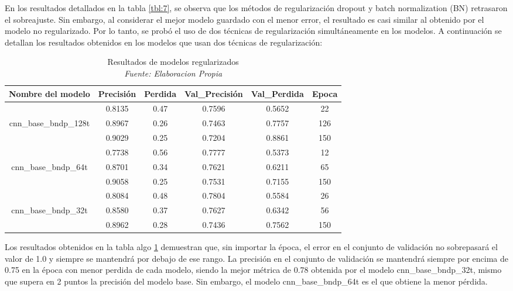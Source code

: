 En los resultados detallados en la tabla \ref{tbl:7}, se observa que los métodos de regularización dropout y batch normalization (BN) retrasaron el sobreajuste. Sin embargo, al considerar el mejor modelo guardado con el menor error, el resultado es casi similar al obtenido por el modelo no regularizado. Por lo tanto, se probó el uso de dos técnicas de regularización simultáneamente en los modelos. A continuación se detallan los resultados obtenidos en los modelos que usan dos técnicas de regularización:

\begin{table}[!ht]
	\centering
	\begin{tabular}{|c|c|c|c|c|c|}
		\hline
		\textbf{Nombre del modelo} & \textbf{Precisión} & \textbf{Perdida} & \textbf{Val\_Precisión} & \textbf{Val\_Perdida} & \textbf{Epoca} \\ \hline
		~ & 0.8135 & 0.47 & 0.7596 & 0.5652 & 22 \\ \cline{2-6}
		cnn\_base\_bndp\_128t & 0.8967 & 0.26 & 0.7463 & 0.7757 & 126 \\ \cline{2-6}
		~ & 0.9029 & 0.25 & 0.7204 & 0.8861 & 150 \\ \hline
		~ & 0.7738 & 0.56 & 0.7777 & 0.5373 & 12 \\ \cline{2-6}
		cnn\_base\_bndp\_64t & 0.8701 & 0.34 & 0.7621 & 0.6211 & 65 \\ \cline{2-6}
		~ & 0.9058 & 0.25 & 0.7531 & 0.7155 & 150 \\ \hline
		~ & 0.8084 & 0.48 & 0.7804 & 0.5584 & 26 \\ \cline{2-6}
		cnn\_base\_bndp\_32t & 0.8580 & 0.37 & 0.7627 & 0.6342 & 56 \\ \cline{2-6}
		~ & 0.8962 & 0.28 & 0.7436 & 0.7562 & 150 \\ \hline
	\end{tabular}
	\caption[Resultados de modelos regularizados]{Resultados de modelos regularizados
		\\\textit{Fuente: Elaboracion Propia}}
	\label{tbl:8}
\end{table}

Los resultados obtenidos en la tabla algo \ref{tbl:8} demuestran que, sin importar la época, el error en el conjunto de validación no sobrepasará el valor de 1.0 y siempre se mantendrá por debajo de ese rango. La precisión en el conjunto de validación se mantendrá siempre por encima de 0.75 en la época con menor perdida de cada modelo, siendo la mejor métrica de 0.78 obtenida por el modelo cnn\_base\_bndp\_32t, mismo que supera en 2 puntos la precisión del modelo base. Sin embargo, el modelo cnn\_base\_bndp\_64t es el que obtiene la menor pérdida.



